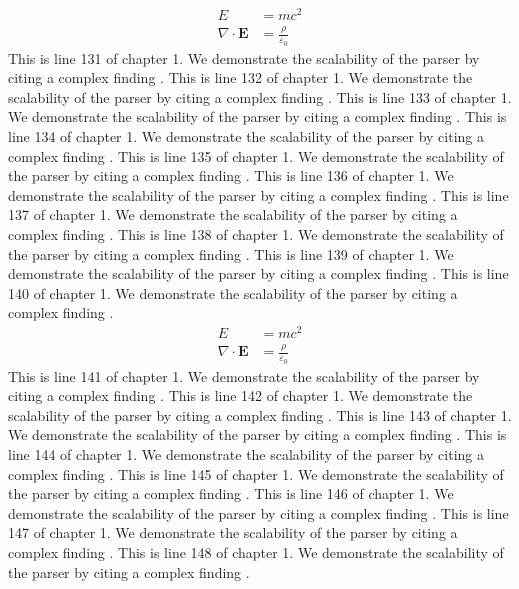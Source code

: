 \begin{align*}
  E &= mc^2 \\
  \nabla \cdot \mathbf{E} &= \frac{\rho}{\varepsilon_0}
\end{align*}
This is line 131 of chapter 1. We demonstrate the scalability of the parser by citing a complex finding \cite{ref1_131}.
This is line 132 of chapter 1. We demonstrate the scalability of the parser by citing a complex finding \cite{ref1_132}.
This is line 133 of chapter 1. We demonstrate the scalability of the parser by citing a complex finding \cite{ref1_133}.
This is line 134 of chapter 1. We demonstrate the scalability of the parser by citing a complex finding \cite{ref1_134}.
This is line 135 of chapter 1. We demonstrate the scalability of the parser by citing a complex finding \cite{ref1_135}.
This is line 136 of chapter 1. We demonstrate the scalability of the parser by citing a complex finding \cite{ref1_136}.
This is line 137 of chapter 1. We demonstrate the scalability of the parser by citing a complex finding \cite{ref1_137}.
This is line 138 of chapter 1. We demonstrate the scalability of the parser by citing a complex finding \cite{ref1_138}.
This is line 139 of chapter 1. We demonstrate the scalability of the parser by citing a complex finding \cite{ref1_139}.
This is line 140 of chapter 1. We demonstrate the scalability of the parser by citing a complex finding \cite{ref1_140}.
\begin{align*}
  E &= mc^2 \\
  \nabla \cdot \mathbf{E} &= \frac{\rho}{\varepsilon_0}
\end{align*}
This is line 141 of chapter 1. We demonstrate the scalability of the parser by citing a complex finding \cite{ref1_141}.
This is line 142 of chapter 1. We demonstrate the scalability of the parser by citing a complex finding \cite{ref1_142}.
This is line 143 of chapter 1. We demonstrate the scalability of the parser by citing a complex finding \cite{ref1_143}.
This is line 144 of chapter 1. We demonstrate the scalability of the parser by citing a complex finding \cite{ref1_144}.
This is line 145 of chapter 1. We demonstrate the scalability of the parser by citing a complex finding \cite{ref1_145}.
This is line 146 of chapter 1. We demonstrate the scalability of the parser by citing a complex finding \cite{ref1_146}.
This is line 147 of chapter 1. We demonstrate the scalability of the parser by citing a complex finding \cite{ref1_147}.
This is line 148 of chapter 1. We demonstrate the scalability of the parser by citing a complex finding \cite{ref1_148}.
